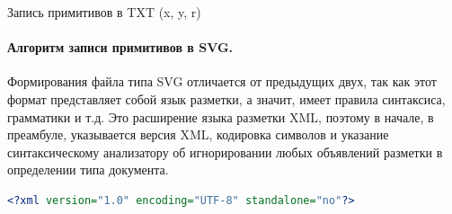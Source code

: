 \begin{algorithm}[H]
	\SetAlgoLined	
	
	
	 
	\caption{Запись примитивов в TXT (x, y, r)}
	\label{alg:primsintotxt}
\end{algorithm}

\paragraph{Алгоритм записи примитивов в SVG.} Формирования файла типа SVG отличается от предыдущих двух, так как этот формат представляет собой язык разметки, а значит, имеет правила синтаксиса, грамматики и т.д. Это расширение языка разметки XML, поэтому в начале, в преамбуле, указывается версия XML, кодировка символов и указание синтаксическому анализатору об игнорировании любых объявлений разметки в определении типа документа.

\begin{lstlisting}[language=XML,caption={Первая строка SVG-файлов},label=list:1stsvgline]
	<?xml version="1.0" encoding="UTF-8" standalone="no"?>
\end{lstlisting}

